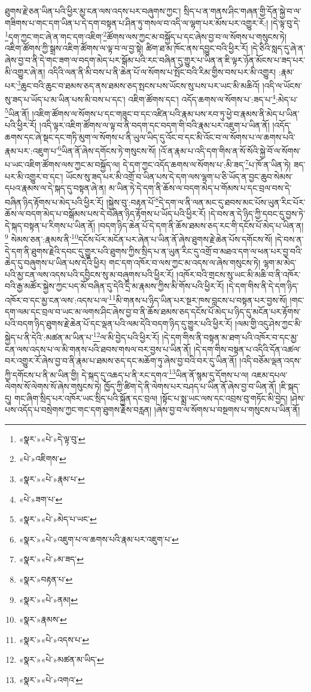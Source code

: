 ཐུགས་རྗེ་ཅན་ཡིན་པའི་ཕྱིར་མྱ་ངན་ལས་འདས་པར་བཞུགས་ཀྱང་། སྲིད་པ་ན་གནས་ཤིང་གཞན་གྱི་དོན་སྐྱེ་བ་ལ་གཟིགས་པ་གང་དག་ཡིན་པ་དེ་དག་བསྟན་པ་ཤིན་ཏུ་གསལ་བ་འདི་ལ་ལྷག་པར་མོས་པར་འགྱུར་རོ:། །དེ་ལྟ་བུ་དེ་\footnote{«སྣར་»«པེ་»དེ་ལྟ་བུ་}དག་ཀྱང་གང་ཞེ་ན་གང་དག་འཇིག་\footnote{«པེ་»འཇིགས་}ཚོགས་ལས་ཀྱང་མ་བསྐྱོད་པ་དང་ཞེས་བྱ་བ་ལ་སོགས་པ་གསུངས་ཏེ། འཇིག་ཚོགས་ཀྱི་སྒྲས་འཇིག་ཚོགས་ལ་ལྟ་བ་ལ་བྱ་སྟེ། ཚིག་ཐ་མ་ཁོང་ནས་དབྱུང་བའི་ཕྱིར་རོ། །དེ་ཅིའི་སླད་དུ་ཞེ་ན་ཞེས་བྱ་བ་ནི་དེ་གང་ཟག་ལ་བདག་མེད་པར་སྒོམ་པའི་རང་བཞིན་དུ་གྱུར་པ་ཡིན་ན་ཇི་ལྟར་ཉོན་མོངས་པ་ཟད་པར་མི་འགྱུར་ཞེ་ན། འདིའི་ལན་ནི་མི་བས་པ་ནི་ཆེན་པོ་ལ་སོགས་པ་སྤོང་བའི་རིམ་གྱིས་བས་པར་མི་འགྱུར། :རྣམ་པར་\footnote{«སྣར་»«པེ་»རྣམ་པ་}ཆུང་བའི་ཆུང་བ་ཐམས་ཅད་ནས་ཐམས་ཅད་སྤངས་པས་ཡོངས་སུ་པས་པར་ཡང་མི་མཆིའོ། །འདི་ལ་ཡོངས་སུ་ཟད་པ་ཡོད་པ་མ་ཡིན་པས་མི་བས་པ་དང་། འཇིག་ཚོགས་དང་། འདོད་ཆགས་ལ་སོགས་པ་:ཟད་པ་\footnote{«པེ་»ཟག་པ་}:མེད་པ་\footnote{«སྣར་»«པེ་»མེད་པ་ཡང་}ཡིན་ནོ། །འཇིག་ཚོགས་ལ་སོགས་པ་དང་གཟུང་བ་དང་འཛིན་པའི་རྣམ་པས་རབ་ཏུ་ཕྱེ་བ་རྣམས་ནི་མེད་པ་ཡིན་པའི་ཕྱིར་རོ། །འདི་ལྟར་འཇིག་ཚོགས་ལ་ལྟ་བ་ནི་བདག་དང་བདག་གི་བའི་རྣམ་པར་འཇུག་པ་ཡིན་ནོ། །འདོད་ཆགས་དང་ཞེ་སྡང་དང་གཏི་མུག་ལ་སོགས་པ་ནི་ཡུལ་ཡིད་དུ་འོང་བ་དང་མི་འོང་བ་ལ་སོགས་པ་ལ་ཆགས་པའི་རྣམ་པར་:འཇུག་པ་\footnote{«སྣར་»«པེ་»འཇུག་པ་ལ་ཆགས་པའི་རྣམ་པར་འཇུག་པ་}ཡིན་ནོ་ཞེས་དགོངས་ཏེ་གསུངས་སོ། །འོ་ན་རྣམ་པ་འདི་དག་གིས་ན་སོ་སོའི་སྐྱེ་བོ་ལ་སོགས་པ་ཡང་འཇིག་ཚོགས་ལས་ཀྱང་མ་བསྐྱོད་ལ། དེ་དག་ཀྱང་འདོད་ཆགས་ལ་སོགས་པ་:མི་ཟད་\footnote{«སྣར་»«པེ་»མ་ཟད་}པ་ཁོ་ན་ཡིན་ཏེ། ཟད་པར་མི་འགྱུར་བ་དང་། ཡོངས་སུ་ཟད་པར་མི་འགྲོ་བ་ཡིན་པས་དེ་དག་ལས་ལྷག་པ་ཅི་ཡོད་ན་བྱང་ཆུབ་སེམས་དཔའ་རྣམས་ལ་དེ་སྐད་དུ་བསྟན་ཞེ་ན། མ་ཡིན་ཏེ་དེ་དག་ནི་ཆོས་ལ་བདག་མེད་པ་གོམས་པ་དང་བྲལ་བས་དེ་བཞིན་ཉིད་རྟོགས་པ་མེད་པའི་ཕྱིར་རོ། །སྐྱེས་བུ་:བརྟན་པོ་\footnote{«སྣར་»བརྟན་པ་}དེ་དག་ལ་ནི་ལན་མང་དུ་ཐབས་མང་པོས་ཡུན་རིང་པོར་ཆོས་ལ་བདག་མེད་པ་བསྒོམས་པས་དེ་བཞིན་ཉིད་རྟོགས་པ་ཡོད་པའི་ཕྱིར་རོ། །དེ་བས་ན་དེ་ཉིད་ཀྱི་དབང་དུ་བྱས་ཏེ་དེ་སྐད་བསྟན་པ་རིགས་པ་ཡིན་ནོ། །བདག་ཉིད་ཆེན་པོ་དེ་དག་ནི་ཆོས་ཐམས་ཅད་རང་གི་དངོས་པོ་མེད་པ་ཡིན་ན།\footnote{«སྣར་»«པེ་»ནམ།} སེམས་ཅན་:རྣམས་ནི་\footnote{«སྣར་»རྣམས་}དངོས་པོར་མངོན་པར་ཞེན་པ་ཡིན་ནོ་ཞེས་ཐུགས་རྗེ་ཆེན་པོས་དགོངས་སོ། །དེ་བས་ན་དེ་དག་ནི་ཐུགས་རྗེའི་དབང་དུ་གྱུར་པའི་ཐུགས་ཀྱིས་སྲིད་པ་ན་ཡུན་རིང་དུ་འགྲོ་བ་མཐའ་དག་ལ་ཕན་པར་བྱ་བའི་ཆེད་དུ་བཞུགས་པ་ཡིན་པས་དེའི་ཕྱིར། གང་དག་འཁོར་བ་ལས་ཀྱང་མ་འདས་ལ་ཞེས་གསུངས་ཏེ། ལྷག་མ་མེད་པའི་མྱ་ངན་ལས་འདས་པའི་དབྱིངས་སུ་མ་བཞུགས་པའི་ཕྱིར་རོ། །འཁོར་བའི་གྲངས་སུ་ཡང་མི་མཆི་བ་ནི་འཁོར་བའི་རྒྱ་མཚོར་སྐྱེས་ཀྱང་པད་མོ་བཞིན་དུ་དེའི་དྲི་མ་རྣམས་ཀྱིས་མི་གོས་པའི་ཕྱིར་རོ། །དེ་དག་གིས་ནི་དེ་དག་ཉིད་འཁོར་བ་དང་མྱ་ངན་ལས་:འདས་པ་ལ་\footnote{«སྣར་»«པེ་»འདས་པ་}མི་གནས་པ་ཉིད་ཡིན་པར་སྔར་ཁས་བླངས་པ་བསྟན་པར་བྱས་སོ། །གང་དག་ལམ་དང་བྲལ་བ་ཡང་མ་ལགས་ཤིང་ཞེས་བྱ་བ་ནི་ཆོས་ཐམས་ཅད་དངོས་པོ་མེད་པ་ཉིད་དུ་མངོན་པར་རྟོགས་པའི་བདག་ཉིད་ཐུགས་རྗེ་ཆེན་པོ་དང་ལྡན་པའི་ལམ་དེའི་བདག་ཉིད་དུ་གྱུར་པའི་ཕྱིར་རོ། །ལམ་གྱི་འདུ་ཤེས་ཀྱང་མི་སྐྱེད་པ་ནི་དེའི་:མཚན་མ་ཡིན་པ་\footnote{«སྣར་»«པེ་»མཚན་མ་ཡིད་}ལ་མི་བྱེད་པའི་ཕྱིར་རོ། །དེ་དག་གིས་ནི་བསྟན་མ་ཐག་པའི་འཁོར་བ་དང་མྱ་ངན་ལས་འདས་པ་ལ་མི་གནས་པའི་ཐབས་གསལ་བར་བྱས་པ་ཡིན་ནོ། །དེ་དག་གིས་བསྟན་པ་འདིའི་དོན་འཚལ་བར་འགྱུར་རོ་ཞེས་བྱ་བ་ནི་རྣམ་པ་ཐམས་ཅད་དང་མཆོག་ཏུ་ཞེས་བྱ་བའི་བར་དུ་ཡིན་ནོ། །འདི་བཅོམ་ལྡན་འདས་ཀྱི་དགོངས་པ་ནི་མ་ཡིན་གྱི། དེ་སྐད་དུ་འཆད་པ་ནི་རང་དགའ་\footnote{«སྣར་»«པེ་»འགའ་}ཡིན་ནོ་སྙམ་དུ་དོགས་པ་ལ། འཇམ་དཔལ་ལེགས་སོ་ལེགས་སོ་ཞེས་གསུངས་ཏེ། ཁྱོད་ཀྱི་ཚིག་དེ་ནི་ལེགས་པར་བཤད་པ་ཡིན་ནོ་ཞེས་བྱ་བ་ཡིན་ནོ། །ཇི་སྐད་དུ། གང་ཞིག་སྲིད་པར་འཁོར་ཡང་སྲིད་པའི་སྐྱོན་དང་བྲལ། །སྟོང་པ་སྨྲ་ཡང་ལས་དང་འབྲས་བུ་གཏོང་མི་བྱེད། །ཤེས་པས་འདོད་པ་བསྲེགས་ཀྱང་གང་དག་ཐུགས་རྗེས་བརླན། །ཞེས་བྱ་བ་ལ་སོགས་པ་བསྔགས་པ་གསུངས་པ་ཡིན་ནོ། 